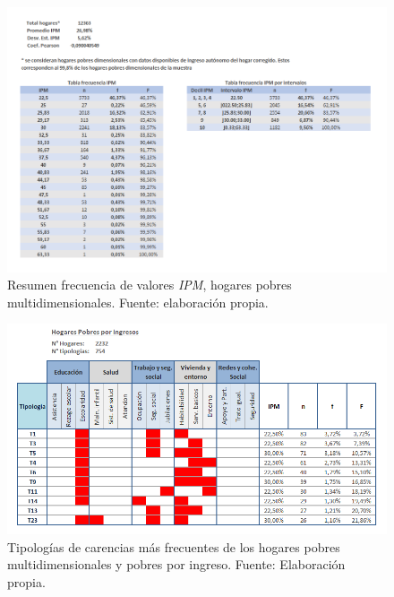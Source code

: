 \documentclass[12pt,letterpaper,spanish]{article}
\begin{document}
\begin{figure}[!]
    \centering
    \includegraphics[width=\textwidth]{Max/resumen_frecuencias_IPM.png}
    \caption{Resumen frecuencia de valores \textit{IPM}, hogares pobres multidimensionales. Fuente: elaboración propia.}
    \label{res_frec}
\end{figure}





\begin{figure}[H]
    \centering
    \includegraphics[width=\textwidth]{Max/tipol_pobres.png}
    \caption{Tipologías de carencias más frecuentes de los hogares pobres multidimensionales y pobres por ingreso. Fuente: Elaboración propia.}
    \label{TipPob}
\end{figure}
\end{document}
